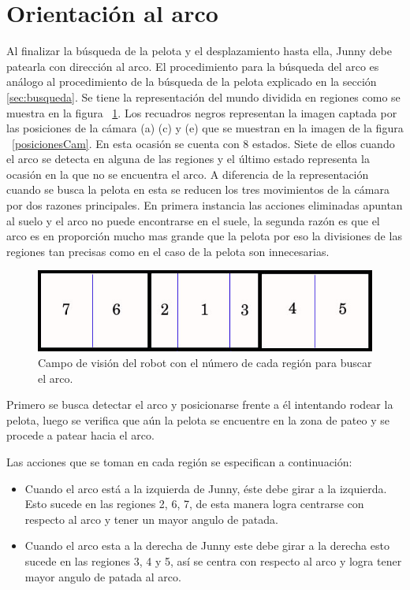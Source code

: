 \section{Orientaci\'on al arco}

Al finalizar la búsqueda de la pelota y el desplazamiento hasta ella, Junny debe patearla con dirección al arco. El procedimiento para la búsqueda del arco es an\'alogo al procedimiento de la b\'usqueda de la pelota explicado en la sección \ref{sec:busqueda}.
Se tiene la representación del mundo dividida en regiones como se muestra en la figura ~\ref{divisionCamArco}. Los recuadros negros representan la imagen captada por las posiciones de la cámara (a) (c) y (e) que se muestran en la imagen de la figura ~\ref{posicionesCam}. En esta ocasi\'on se cuenta con 8 estados. Siete de ellos cuando el arco se detecta en alguna de las regiones y el último estado representa la ocasión en la que no se encuentra el arco. 
A diferencia de la representaci\'on cuando se busca la pelota en esta se reducen los tres movimientos de la c\'amara por dos razones principales. En primera instancia las acciones eliminadas apuntan al suelo y el arco no puede encontrarse en el suele, la segunda raz\'on es que el arco es en proporci\'on mucho mas grande que la pelota por eso la divisiones de las regiones tan precisas como en el caso de la pelota son innecesarias.
\begin{figure}[hbtp]
\centering
\includegraphics[scale=0.5]{imagenes/RegionesArco.jpg}
\caption{Campo de visión del robot con el número de cada región para buscar el arco. }
\label{divisionCamArco}
\end{figure}

Primero se busca detectar el arco y posicionarse frente a él intentando rodear la pelota, luego se verifica que a\'un la pelota se encuentre en la zona de pateo y se procede a patear hacia el arco.

Las acciones que se toman en cada regi\'on se especifican a continuación: 
 \begin{itemize}

\item Cuando el arco está a la izquierda de Junny, éste debe girar a la izquierda. Esto sucede en las regiones 2, 6, 7, de esta manera logra centrarse con respecto al arco y tener un mayor angulo de patada.

\item Cuando el arco esta a la derecha de Junny este debe girar a la derecha esto sucede en las regiones 3, 4 y 5, así se centra con respecto al arco y logra tener mayor angulo de patada al arco.


\end{itemize}

